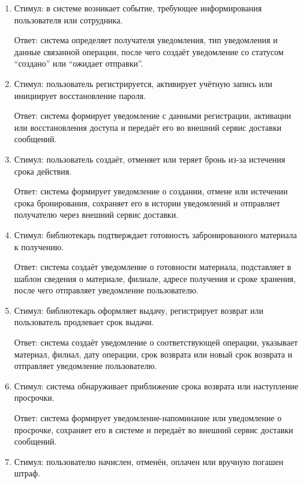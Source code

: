 \documentclass[12pt,a4paper]{article}
\begin{document}
	\begin{enumerate}
		\item Стимул: в системе возникает событие, требующее информирования пользователя
		или сотрудника.
		
		Ответ: система определяет получателя уведомления, тип уведомления и данные
		связанной операции, после чего создаёт уведомление со статусом ``создано''
		или ``ожидает отправки''.
		
		\item Стимул: пользователь регистрируется, активирует учётную запись или
		инициирует восстановление пароля.
		
		Ответ: система формирует уведомление с данными регистрации, активации
		или восстановления доступа и передаёт его во внешний сервис доставки сообщений.
		
		\item Стимул: пользователь создаёт, отменяет или теряет бронь из-за истечения
		срока действия.
		
		Ответ: система формирует уведомление о создании, отмене или истечении
		срока бронирования, сохраняет его в истории уведомлений и отправляет
		получателю через внешний сервис доставки.
		
		\item Стимул: библиотекарь подтверждает готовность забронированного материала
		к получению.
		
		Ответ: система создаёт уведомление о готовности материала, подставляет
		в шаблон сведения о материале, филиале, адресе получения и сроке хранения,
		после чего отправляет уведомление пользователю.
		
		\item Стимул: библиотекарь оформляет выдачу, регистрирует возврат или пользователь
		продлевает срок выдачи.
		
		Ответ: система создаёт уведомление о соответствующей операции, указывает
		материал, филиал, дату операции, срок возврата или новый срок возврата
		и отправляет уведомление пользователю.
		
		\item Стимул: система обнаруживает приближение срока возврата или наступление
		просрочки.
		
		Ответ: система формирует уведомление-напоминание или уведомление о просрочке,
		сохраняет его в системе и передаёт во внешний сервис доставки сообщений.
		
		\item Стимул: пользователю начислен, отменён, оплачен или вручную погашен штраф.
		

\end{enumerate}
\end{document}
